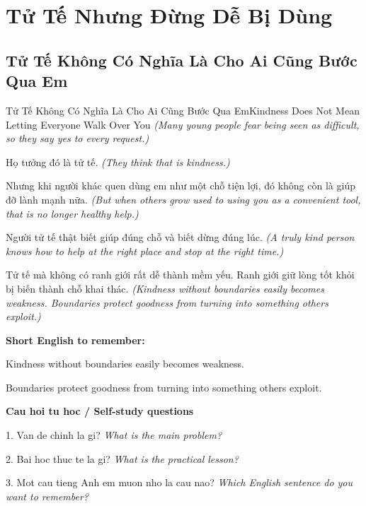\chapter{Tử Tế Nhưng Đừng Dễ Bị Dùng}

\section{Tử Tế Không Có Nghĩa Là Cho Ai Cũng Bước Qua Em}
\begin{truyen}{Tử Tế Không Có Nghĩa Là Cho Ai Cũng Bước Qua Em}{Kindness Does Not Mean Letting Everyone Walk Over You}
\textit{(Many young people fear being seen as difficult, so they say yes to every request.)}

Họ tưởng đó là tử tế.
\textit{(They think that is kindness.)}

Nhưng khi người khác quen dùng em như một chỗ tiện lợi, đó không còn là giúp đỡ lành mạnh nữa.
\textit{(But when others grow used to using you as a convenient tool, that is no longer healthy help.)}

Người tử tế thật biết giúp đúng chỗ và biết dừng đúng lúc.
\textit{(A truly kind person knows how to help at the right place and stop at the right time.)}

\end{truyen}

\begin{baihoc}
Tử tế mà không có ranh giới rất dễ thành mềm yếu. Ranh giới giữ lòng tốt khỏi bị biến thành chỗ khai thác.
\textit{(Kindness without boundaries easily becomes weakness. Boundaries protect goodness from turning into something others exploit.)}
\end{baihoc}

\begin{ghinhoanh}
\textbf{Short English to remember:}

Kindness without boundaries easily becomes weakness.

Boundaries protect goodness from turning into something others exploit.

\end{ghinhoanh}

\begin{tuhocnhanh}
\textbf{Cau hoi tu hoc / Self-study questions}

1. Van de chinh la gi? \textit{What is the main problem?}

2. Bai hoc thuc te la gi? \textit{What is the practical lesson?}

3. Mot cau tieng Anh em muon nho la cau nao? \textit{Which English sentence do you want to remember?}
\end{tuhocnhanh}
\ngancach

